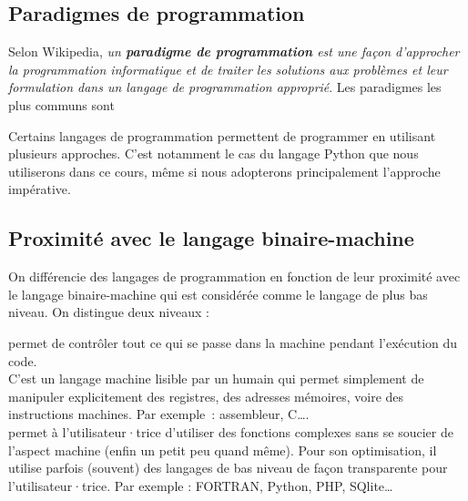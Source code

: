 \documentclass[11pt, a4paper]{book}
\begin{document}
\subsection{Paradigmes de programmation}
Selon Wikipedia, \textit{un \textbf{paradigme de programmation} est une façon d'approcher la programmation informatique et de traiter les solutions aux problèmes et leur formulation dans un langage de programmation approprié}. Les paradigmes les plus communs sont 
\begin{enumerate}
\end{enumerate}
Certains langages de programmation permettent de programmer en utilisant plusieurs approches. C'est notamment le cas du langage Python que nous utiliserons dans ce cours, même si nous adopterons principalement l'approche impérative.

\subsection{Proximité avec le langage binaire-machine}	
On différencie  des langages de programmation  en fonction de leur proximité avec le langage binaire-machine qui est considérée comme le langage de plus bas niveau. On distingue deux niveaux :
\begin{enumerate}
	  permet de contrôler tout ce qui se passe dans la machine pendant l'exécution du code.\\
	C'est un langage machine lisible par un humain qui permet simplement de  manipuler explicitement des registres, des adresses mémoires, voire des instructions machines.  Par exemple~: assembleur, C\ldots.\\
	
	
	  permet à l'utilisateur·trice d'utiliser des fonctions complexes sans se soucier de l'aspect machine (enfin un petit peu quand même).  Pour son optimisation, il utilise parfois (souvent) des langages de bas niveau de façon transparente pour l'utilisateur·trice.  Par exemple : FORTRAN, Python, PHP, SQlite\ldots
\end{enumerate}
\end{document}
